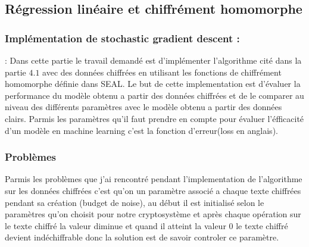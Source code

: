 \documentclass[a4paper,12pt]{article}
\begin{document}
  \subsection{Régression linéaire et chiffrément homomorphe}
  \subsubsection{Implémentation de stochastic gradient descent : \cite{code_HE_lr}}: 
  Dans cette partie le travail demandé est d'implémenter l'algorithme cité dans la partie $4.1$ avec des données chiffrées en utilisant les fonctions de chiffrément homomorphe définie dans SEAL. \newline 
  Le but de cette implementation est d'évaluer la performance du modèle obtenu a partir des données chiffrées et de le comparer au niveau des différents paramètres avec le modèle obtenu a partir des données clairs.\newline
  Parmis les paramètres qu'il faut prendre en compte pour évaluer l'éfficacité d'un modèle en machine learning c'est la fonction d'erreur(loss en anglais).\newline  
  \subsubsection{Problèmes}
  Parmis les problèmes que j'ai rencontré pendant l'implementation de l'algorithme  sur les données chiffrées c'est qu'on un paramètre associé a chaque texte chiffrées pendant sa création (budget de noise), au début il est initialisé selon le paramètres qu'on choisit pour notre cryptosystème  et après chaque opération sur le texte chiffré la valeur diminue et quand il atteint la valeur 0 le texte chiffré devient indéchiffrable donc la solution est de savoir controler ce paramètre.
\end{document}
